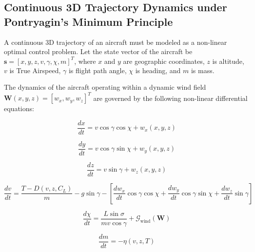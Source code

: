 \documentclass[11pt,a4paper]{book}
\begin{document}
\subsection{Continuous 3D Trajectory Dynamics under Pontryagin's Minimum Principle}

A continuous 3D trajectory of an aircraft must be modeled as a non-linear optimal control problem. Let the state vector of the aircraft be $\mathbf{s} = [x, y, z, v, \gamma, \chi, m]^T$, where $x$ and $y$ are geographic coordinates, $z$ is altitude, $v$ is True Airspeed, $\gamma$ is flight path angle, $\chi$ is heading, and $m$ is mass.

The dynamics of the aircraft operating within a dynamic wind field $\mathbf{W}(x, y, z) = [w_x, w_y, w_z]^T$ are governed by the following non-linear differential equations:

\begin{equation}
\frac{dx}{dt} = v \cos \gamma \cos \chi + w_x(x,y,z)
\end{equation}

\begin{equation}
\frac{dy}{dt} = v \cos \gamma \sin \chi + w_y(x,y,z)
\end{equation}

\begin{equation}
\frac{dz}{dt} = v \sin \gamma + w_z(x,y,z)
\end{equation}

\begin{equation}
\frac{dv}{dt} = \frac{T - D(v, z, C_L)}{m} - g \sin \gamma - \left[ \frac{d w_x}{dt} \cos \gamma \cos \chi + \frac{d w_y}{dt} \cos \gamma \sin \chi + \frac{d w_z}{dt} \sin \gamma \right]
\end{equation}

\begin{equation}
\frac{d \chi}{dt} = \frac{L \sin \sigma}{m v \cos \gamma} + \mathcal{G}_{\text{wind}}(\mathbf{W})
\end{equation}

\begin{equation}
\frac{dm}{dt} = - \eta(v, z, T)
\end{equation}
\end{document}

